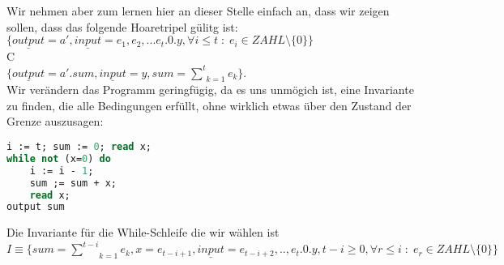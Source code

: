 \documentclass[11pt,a4paper,ngerman]{article}
\begin{document}
Wir nehmen aber zum lernen hier an dieser Stelle einfach an, dass wir zeigen sollen, dass das folgende Hoaretripel gülitg ist:
$
\{ \underline{output} = a',  \underline{input} = e_1,e_2,...e_t.0.y, \forall i \leq t \; : \; e_i \in ZAHL \setminus \{0\}\}
$\\
C\\
$
\{ \underline{output} = a'.sum, \underline{input} = y , sum = \underset{k=1}{\overset{t}{\sum}} e_k \}.
$\\
Wir verändern das Programm geringfügig, da es uns unmögich ist, eine Invariante zu finden, die alle Bedingungen erfüllt, ohne wirklich etwas über den Zustand der Grenze auszusagen:\\
\begin{lstlisting}[language=Pascal]
i := t; sum := 0; read x;
while not (x=0) do
    i := i - 1;
    sum ;= sum + x;
    read x;
output sum
\end{lstlisting}

Die Invariante für die While-Schleife die wir wählen ist
$I \equiv \{ sum =  \underset{k=1}{\overset{t-i}{\sum}} e_k,  x = e_{t-i+1} , \underline{input} = e_{t-i+2},..,e_{t}.0.y , t - i \geq 0
, \forall r \leq i \; : \; e_r \in ZAHL \setminus \{ 0 \}\}$
\end{document}
